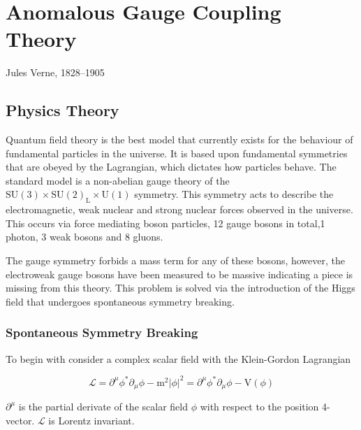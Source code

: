 \chapter{Anomalous Gauge Coupling Theory}
\label{chap:anomalousgaugecouplingtheory}

{Jules Verne, 1828--1905}


\section{Physics Theory}
Quantum field theory is the best model that currently exists for the behaviour of fundamental particles in the universe.  It is based upon fundamental symmetries that are obeyed by the Lagrangian, which dictates how particles behave.  The standard model is a non-abelian gauge theory of the $\text{SU}(3) \times \text{SU}(2)_{\text{L}} \times \text{U}(1)$ symmetry.  This symmetry acts to describe the electromagnetic, weak nuclear and strong nuclear forces observed in the universe.  This occurs via force mediating boson particles, 12 gauge bosons in total,1 photon, 3 weak bosons and 8 gluons.  

The gauge symmetry forbids a mass term for any of these bosons, however, the electroweak gauge bosons have been measured to be massive indicating a piece is missing from this theory.  This problem is solved via the introduction of the Higgs field that undergoes spontaneous symmetry breaking.

\subsection{Spontaneous Symmetry Breaking}
\label{sec:ssb}
To begin with consider a complex scalar field \phi with the Klein-Gordon Lagrangian

\begin{equation}
\mathcal{L} = \partial^{\mu} \phi^{*} \partial_{\mu} \phi - \text{m}^{2} |\phi|^{2} = \partial^{\mu} \phi^{*} \partial_{\mu} \phi - \text{V}(\phi)
\end{equation}

$\partial^{\mu}$ is the partial derivate of the scalar field $\phi$ with respect to the position 4-vector.  $\mathcal{L}$ is Lorentz invariant.

